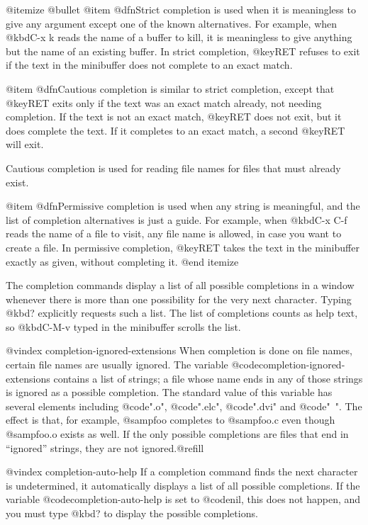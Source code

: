 {{@itemize @bullet
@item
@dfn{Strict} completion is used when it is meaningless to give any
argument except one of the known alternatives.  For example, when
@kbd{C-x k} reads the name of a buffer to kill, it is meaningless to
give anything but the name of an existing buffer.  In strict
completion, @key{RET} refuses to exit if the text in the minibuffer
does not complete to an exact match.

@item
@dfn{Cautious} completion is similar to strict completion, except that
@key{RET} exits only if the text was an exact match already, not
needing completion.  If the text is not an exact match, @key{RET} does
not exit, but it does complete the text.  If it completes to an exact
match, a second @key{RET} will exit.

Cautious completion is used for reading file names for files that must
already exist.

@item
@dfn{Permissive} completion is used when any string is
meaningful, and the list of completion alternatives is just a guide.
For example, when @kbd{C-x C-f} reads the name of a file to visit, any
file name is allowed, in case you want to create a file.  In
permissive completion, @key{RET} takes the text in the minibuffer
exactly as given, without completing it.
@end itemize

  The completion commands display a list of all possible completions in a
window whenever there is more than one possibility for the very next
character.  Typing @kbd{?} explicitly requests such a list.  The
list of completions counts as help text, so @kbd{C-M-v} typed in the
minibuffer scrolls the list.

@vindex completion-ignored-extensions
  When completion is done on file names, certain file names are usually
ignored.  The variable @code{completion-ignored-extensions} contains a list
of strings; a file whose name ends in any of those strings is ignored as a
possible completion.  The standard value of this variable has several
elements including @code{".o"}, @code{".elc"}, @code{".dvi"} and @code{"~"}.
The effect is that, for example, @samp{foo} completes to @samp{foo.c}
even though @samp{foo.o} exists as well.  If the only possible completions
are files that end in ``ignored'' strings, they are not ignored.@refill

@vindex completion-auto-help
  If a completion command finds the next character is undetermined, it
automatically displays a list of all possible completions.  If the variable
@code{completion-auto-help} is set to @code{nil}, this does not happen,
and you must type @kbd{?} to display the possible completions.

}}

